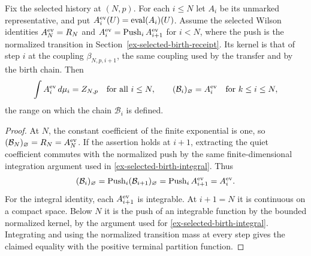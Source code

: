 \begin{lemma}
\label{lem:ex-selected-birth-denominator}
Fix the selected history at $(N,p)$. For each $i\le N$ let $A_i$
be its unmarked representative, and put $A_i^{\rm ev}(U)=\operatorname{eval}(A_i)(U)$.
Assume the selected Wilson identities
$A_N^{\rm ev}=R_N$ and $A_i^{\rm ev}=\operatorname{Push}_i A_{i+1}^{\rm ev}$ for $i<N$,
where the push is the normalized transition in
Section~\ref{ex-selected-birth-receipt}. Its kernel is that of step $i$
at the coupling $\beta_{N,p,i+1}$, the same coupling used by the
transfer and by the birth chain. Then
\[
 \int A_i^{\rm ev}\,d\mu_i=Z_{N,p}\quad\text{for all }i\le N,
 \qquad
 (\mathcal B_i)_\varnothing=A_i^{\rm ev}\quad\text{for }k\le i\le N,
\]
the range on which the chain $\mathcal B_i$ is defined.
\end{lemma}
\begin{proof}
At $N$, the constant coefficient of the finite exponential is one,
so $(\mathcal B_N)_\varnothing=R_N=A_N^{\rm ev}$. If the assertion holds at
$i+1$, extracting the quiet coefficient commutes with the normalized
push by the same finite-dimensional integration argument used in
\eqref{ex-selected-birth-integral}. Thus
\[
 (\mathcal B_i)_\varnothing
 =\operatorname{Push}_i(\mathcal B_{i+1})_\varnothing
 =\operatorname{Push}_i A_{i+1}^{\rm ev}=A_i^{\rm ev}.
\]
For the integral identity, each $A_{i+1}^{\rm ev}$ is integrable. At
$i+1=N$ it is continuous on a compact space. Below $N$ it is the push of
an integrable function by the bounded normalized kernel, by the argument
used for \eqref{ex-selected-birth-integral}. Integrating and using the
normalized transition mass at every step gives the claimed equality
with the positive terminal partition function.
\end{proof}

